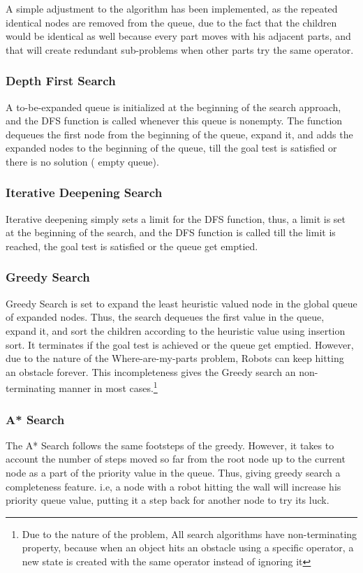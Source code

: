 A simple adjustment to the algorithm has been implemented, as the repeated identical nodes are removed from the queue, due to the fact that the children would be identical as well because every part moves with his adjacent parts, and that will create redundant sub-problems when other parts try the same operator. 

\subsubsection{Depth First Search}

A to-be-expanded queue is initialized at the beginning of the search approach, and the DFS function is called whenever this queue is nonempty. The function dequeues the first node from the beginning of the queue, expand it, and adds the expanded nodes to the beginning of the queue, till the goal test is satisfied or there is no solution ( empty queue). 


\subsubsection{Iterative Deepening Search}

Iterative deepening simply sets a limit for the DFS function, thus, a limit is set at the beginning of the search, and the DFS function is called till the limit is reached, the goal test is satisfied or the queue get emptied.

\subsubsection{Greedy Search}
Greedy Search is set to expand the least heuristic valued node in the global queue of expanded nodes. Thus, the search dequeues the first value in the queue, expand it, and sort the children according to the heuristic value using insertion sort. It terminates if the goal test is achieved or the queue get emptied. However, due to the nature of the Where-are-my-parts problem, Robots can keep hitting an obstacle forever. This incompleteness gives the Greedy search an non-terminating manner in most cases.\footnote{Due to the nature of the problem, All search algorithms have non-terminating property, because when an object hits an obstacle using a specific operator, a new state is created with the same operator instead of ignoring it}

\subsubsection{A* Search}
The A* Search follows the same footsteps of the greedy. However, it takes to account the number of steps moved so far from the root node up to the current node as a part of the priority value in the queue. Thus, giving greedy search a completeness feature. i.e, a node with a robot hitting the wall will increase his priority queue value, putting it a step back for another node to try its luck.

